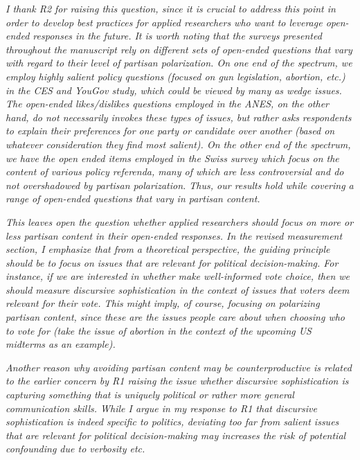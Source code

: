 \textit{I thank R2 for raising this question, since it is crucial to address this point in order to develop best practices for applied researchers who want to leverage open-ended responses in the future. It is worth noting that the surveys presented throughout the manuscript rely on different sets of open-ended questions that vary with regard to their level of partisan polarization. On one end of the spectrum, we employ highly salient policy questions (focused on gun legislation, abortion, etc.) in the CES and YouGov study, which could be viewed by many as wedge issues. The open-ended likes/dislikes questions employed in the ANES, on the other hand, do not necessarily invokes these types of issues, but rather asks respondents to explain their preferences for one party or candidate over another (based on whatever consideration they find most salient). On the other end of the spectrum, we have the open ended items employed in the Swiss survey which focus on the content of various policy referenda, many of which are less controversial and do not overshadowed by partisan polarization. Thus, our results hold while covering a range of open-ended questions that vary in partisan content.}
	
\textit{This leaves open the question whether applied researchers should focus on more or less partisan content in their open-ended responses. In the revised measurement section, I emphasize that from a theoretical perspective, the guiding principle should be to focus on issues that are relevant for political decision-making. For instance, if we are interested in whether make well-informed vote choice, then we should measure discursive sophistication in the context of issues that voters deem relevant for their vote. This might imply, of course, focusing on polarizing partisan content, since these are the issues people care about when choosing who to vote for (take the issue of abortion in the context of the upcoming US midterms as an example).}
	
\textit{Another reason why avoiding partisan content may be counterproductive is related to the earlier concern by R1 raising the issue whether discursive sophistication is capturing something that is uniquely political or rather more general communication skills. While I argue in my response to R1 that discursive sophistication is indeed specific to politics, deviating too far from salient issues that are relevant for political decision-making may increases the risk of potential confounding due to verbosity etc.}


